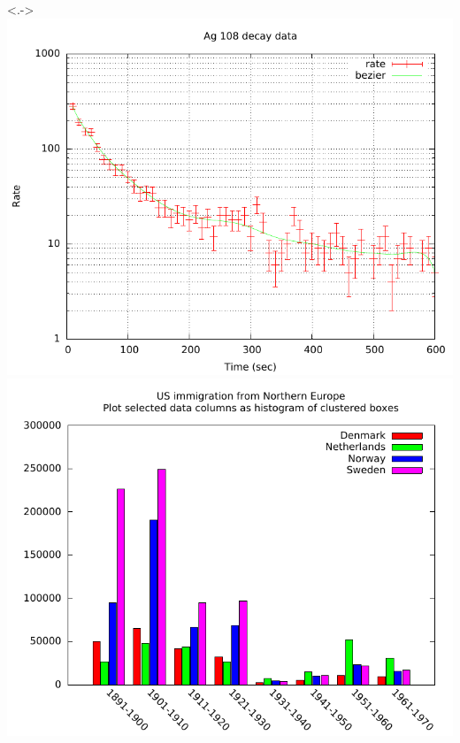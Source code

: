 \begin{frame}[<+->][fragile]
	\centering
	\begin{columns}<.->
		\includegraphics[width=\textwidth]{res/gnuplot_silver.pdf}
		\hspace*{-0.02\textwidth}
		\includegraphics[width=\textwidth]{res/gnuplot_histogram.pdf}
		\hspace*{-0.02\textwidth}
		\hspace*{-0.02\textwidth}

\end{columns}
\end{frame}
